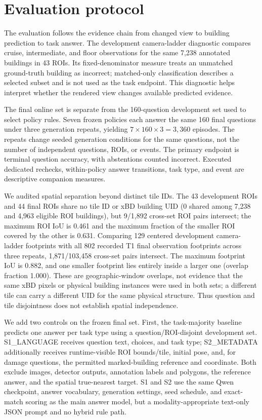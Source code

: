 \section{Evaluation protocol}
\label{sec:setup}
The evaluation follows the evidence chain from changed view to building prediction to task answer. The development camera-ladder diagnostic compares cruise, intermediate, and floor observations for the same 7,238 annotated buildings in 43 ROIs. Its fixed-denominator measure treats an unmatched ground-truth building as incorrect; matched-only classification describes a selected subset and is not used as the task endpoint. This diagnostic helps interpret whether the rendered view changes available predicted evidence.

The final online set is separate from the 160-question development set used to select policy rules. Seven frozen policies each answer the same 160 final questions under three generation repeats, yielding $7\times160\times3=3{,}360$ episodes. The repeats change seeded generation conditions for the same questions, not the number of independent questions, ROIs, or events. The primary endpoint is terminal question accuracy, with abstentions counted incorrect. Executed dedicated rechecks, within-policy answer transitions, task type, and event are descriptive companion measures.

We audited spatial separation beyond distinct tile IDs. The 43 development ROIs and 44 final ROIs share no tile ID or xBD building UID (0 shared among 7,238 and 4,963 eligible ROI buildings), but 9/1,892 cross-set ROI pairs intersect; the maximum ROI IoU is 0.461 and the maximum fraction of the smaller ROI covered by the other is 0.631. Comparing 129 centered development camera-ladder footprints with all 802 recorded T1 final observation footprints across three repeats, 1,871/103,458 cross-set pairs intersect. The maximum footprint IoU is 0.882, and one smaller footprint lies entirely inside a larger one (overlap fraction 1.000). These are geographic-window overlaps, not evidence that the same xBD pixels or physical building instances were used in both sets; a different tile can carry a different UID for the same physical structure. Thus question and tile disjointness does not establish spatial independence.

We add two controls on the frozen final set. First, the task-majority baseline predicts one answer per task type using a question/ROI-disjoint development set. S1\_LANGUAGE receives question text, choices, and task type; S2\_METADATA additionally receives runtime-visible ROI bounds/tile, initial pose, and, for damage questions, the permitted marked-building reference and coordinate. Both exclude images, detector outputs, annotation labels and polygons, the reference answer, and the spatial true-nearest target. S1 and S2 use the same Qwen checkpoint, answer vocabulary, generation settings, seed schedule, and exact-match scoring as the main answer model, but a modality-appropriate text-only JSON prompt and no hybrid rule path.

